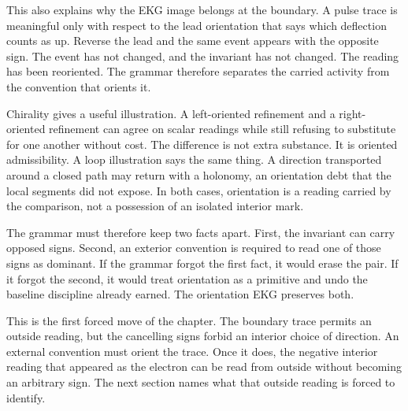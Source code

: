 This also explains why the EKG image belongs at the boundary. A pulse trace
is meaningful only with respect to the lead orientation that says which
deflection counts as up. Reverse the lead and the same event appears with the
opposite sign. The event has not changed, and the invariant has not changed.
The reading has been reoriented. The grammar therefore separates the carried
activity from the convention that orients it.

Chirality gives a useful illustration. A left-oriented refinement and a
right-oriented refinement can agree on scalar readings while still refusing
to substitute for one another without cost. The difference is not extra
substance. It is oriented admissibility. A loop illustration says the same
thing. A direction transported around a closed path may return with a
holonomy, an orientation debt that the local segments did not expose. In both
cases, orientation is a reading carried by the comparison, not a possession
of an isolated interior mark.

The grammar must therefore keep two facts apart. First, the invariant can
carry opposed signs. Second, an exterior convention is required to read one
of those signs as dominant. If the grammar forgot the first fact, it would
erase the pair. If it forgot the second, it would treat orientation as a
primitive and undo the baseline discipline already earned. The orientation
EKG preserves both.

This is the first forced move of the chapter. The boundary trace permits an
outside reading, but the cancelling signs forbid an interior choice of
direction. An external convention must orient the trace. Once it does, the
negative interior reading that appeared as the electron can be read from
outside without becoming an arbitrary sign. The next section names what that
outside reading is forced to identify.
